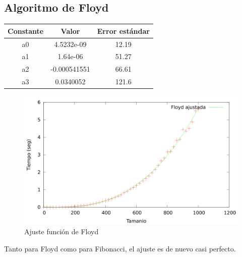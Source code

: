 \documentclass{article}
\begin{document}
	\subsection{Algoritmo de Floyd}
	
	
	\begin{longtable}{|c|c|c|}
		\hline
		Constante		& Valor			& Error estándar	\\ \hline
		a0              & 4.5232e-09	& 12.19 \\ \hline
		a1              & 1.64e-06		& 51.27 \\ \hline
		a2              & -0.000541551	& 66.61 \\ \hline
		a3              & 0.0340052		& 121.6 \\ \hline
	\end{longtable}
	
	\begin{figure}[H]
		\centering
		\includegraphics[totalheight=8cm]{img/Floyd_ajustada}
		\caption{Ajuste función de Floyd}
		\label{fig:Floyd_ajustada}
	\end{figure}
	
	Tanto para Floyd como para Fibonacci, el ajuste es de nuevo casi perfecto.
	
\end{document}
